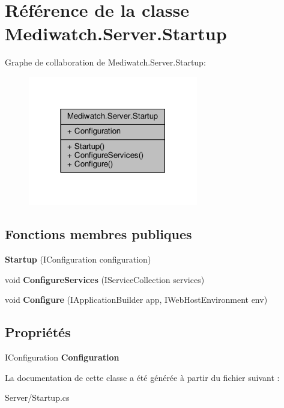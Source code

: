 \hypertarget{class_mediwatch_1_1_server_1_1_startup}{}\section{Référence de la classe Mediwatch.\+Server.\+Startup}
\label{class_mediwatch_1_1_server_1_1_startup}


Graphe de collaboration de Mediwatch.\+Server.\+Startup\+:\nopagebreak
\begin{figure}[H]
\begin{center}
\leavevmode
\includegraphics[width=210pt]{class_mediwatch_1_1_server_1_1_startup__coll__graph}
\end{center}
\end{figure}
\subsection*{Fonctions membres publiques}
\begin{DoxyCompactItemize}
\item 
\mbox{\label{class_mediwatch_1_1_server_1_1_startup_a99779cbd7c184cbff98730a5f285a647}} 
{\bfseries Startup} (I\+Configuration configuration)
\item 
\mbox{\label{class_mediwatch_1_1_server_1_1_startup_a98b7f4b5e49a83c353687ec3c1cfa139}} 
void {\bfseries Configure\+Services} (I\+Service\+Collection services)
\item 
\mbox{\label{class_mediwatch_1_1_server_1_1_startup_af31b63124f79f812e79cb6f43df14a40}} 
void {\bfseries Configure} (I\+Application\+Builder app, I\+Web\+Host\+Environment env)
\end{DoxyCompactItemize}
\subsection*{Propriétés}
\begin{DoxyCompactItemize}
\item 
\mbox{\label{class_mediwatch_1_1_server_1_1_startup_ae3d0512feacc2872ab0ec4d5082626a6}} 
I\+Configuration {\bfseries Configuration}
\end{DoxyCompactItemize}


La documentation de cette classe a été générée à partir du fichier suivant \+:\begin{DoxyCompactItemize}
\item 
Server/Startup.\+cs\end{DoxyCompactItemize}
